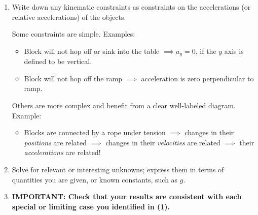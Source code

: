\documentclass[11pt, letterpaper, openany]{book}
\begin{document}
\begin{enumerate}
    \item Write down any kinematic constraints as constraints on the accelerations (or relative accelerations) of the objects.
    
    Some constraints are simple. Examples:
    \begin{itemize}
        \item Block will not hop off or sink into the table $\implies a_y = 0$, if the $y$ axis is defined to be vertical.
        \item Block will not hop off the ramp $\implies$ acceleration is zero perpendicular to ramp.
    \end{itemize}
    Others are more complex and benefit from a clear well-labeled diagram. Example:
    \begin{itemize}
        \item Blocks are connected by a rope under tension $\implies$ changes in their \textit{positions} are related $\implies$ changes in their \textit{velocities} are related $\implies$ their \textit{accelerations} are related!
    \end{itemize}
    
    \item Solve for relevant or interesting unknowns; express them in terms of quantities you are given, or known constants, such as $g$.
    
    \item \textbf{IMPORTANT: Check that your results are consistent with each special or limiting case you identified in (1).}
\end{enumerate}
\end{document}
